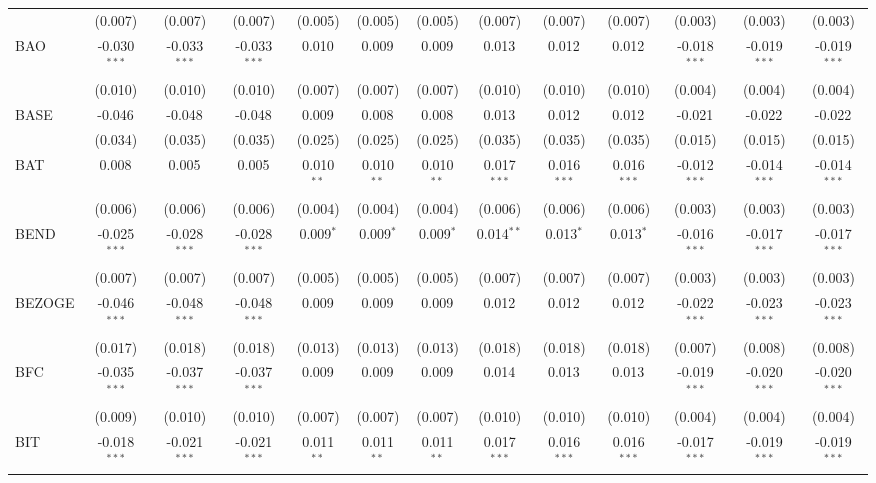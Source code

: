 \begin{table}[!htbp]
\begin{tabular}{@{\extracolsep{5pt}}lcccccccccccc}
  & (0.007) & (0.007) & (0.007) & (0.005) & (0.005) & (0.005) & (0.007) & (0.007) & (0.007) & (0.003) & (0.003) & (0.003) \\
 BAO & -0.030$^{***}$ & -0.033$^{***}$ & -0.033$^{***}$ & 0.010$^{}$ & 0.009$^{}$ & 0.009$^{}$ & 0.013$^{}$ & 0.012$^{}$ & 0.012$^{}$ & -0.018$^{***}$ & -0.019$^{***}$ & -0.019$^{***}$ \\
  & (0.010) & (0.010) & (0.010) & (0.007) & (0.007) & (0.007) & (0.010) & (0.010) & (0.010) & (0.004) & (0.004) & (0.004) \\
 BASE & -0.046$^{}$ & -0.048$^{}$ & -0.048$^{}$ & 0.009$^{}$ & 0.008$^{}$ & 0.008$^{}$ & 0.013$^{}$ & 0.012$^{}$ & 0.012$^{}$ & -0.021$^{}$ & -0.022$^{}$ & -0.022$^{}$ \\
  & (0.034) & (0.035) & (0.035) & (0.025) & (0.025) & (0.025) & (0.035) & (0.035) & (0.035) & (0.015) & (0.015) & (0.015) \\
 BAT & 0.008$^{}$ & 0.005$^{}$ & 0.005$^{}$ & 0.010$^{**}$ & 0.010$^{**}$ & 0.010$^{**}$ & 0.017$^{***}$ & 0.016$^{***}$ & 0.016$^{***}$ & -0.012$^{***}$ & -0.014$^{***}$ & -0.014$^{***}$ \\
  & (0.006) & (0.006) & (0.006) & (0.004) & (0.004) & (0.004) & (0.006) & (0.006) & (0.006) & (0.003) & (0.003) & (0.003) \\
 BEND & -0.025$^{***}$ & -0.028$^{***}$ & -0.028$^{***}$ & 0.009$^{*}$ & 0.009$^{*}$ & 0.009$^{*}$ & 0.014$^{**}$ & 0.013$^{*}$ & 0.013$^{*}$ & -0.016$^{***}$ & -0.017$^{***}$ & -0.017$^{***}$ \\
  & (0.007) & (0.007) & (0.007) & (0.005) & (0.005) & (0.005) & (0.007) & (0.007) & (0.007) & (0.003) & (0.003) & (0.003) \\
 BEZOGE & -0.046$^{***}$ & -0.048$^{***}$ & -0.048$^{***}$ & 0.009$^{}$ & 0.009$^{}$ & 0.009$^{}$ & 0.012$^{}$ & 0.012$^{}$ & 0.012$^{}$ & -0.022$^{***}$ & -0.023$^{***}$ & -0.023$^{***}$ \\
  & (0.017) & (0.018) & (0.018) & (0.013) & (0.013) & (0.013) & (0.018) & (0.018) & (0.018) & (0.007) & (0.008) & (0.008) \\
 BFC & -0.035$^{***}$ & -0.037$^{***}$ & -0.037$^{***}$ & 0.009$^{}$ & 0.009$^{}$ & 0.009$^{}$ & 0.014$^{}$ & 0.013$^{}$ & 0.013$^{}$ & -0.019$^{***}$ & -0.020$^{***}$ & -0.020$^{***}$ \\
  & (0.009) & (0.010) & (0.010) & (0.007) & (0.007) & (0.007) & (0.010) & (0.010) & (0.010) & (0.004) & (0.004) & (0.004) \\
 BIT & -0.018$^{***}$ & -0.021$^{***}$ & -0.021$^{***}$ & 0.011$^{**}$ & 0.011$^{**}$ & 0.011$^{**}$ & 0.017$^{***}$ & 0.016$^{***}$ & 0.016$^{***}$ & -0.017$^{***}$ & -0.019$^{***}$ & -0.019$^{***}$ \\

\end{tabular}
\end{table}
